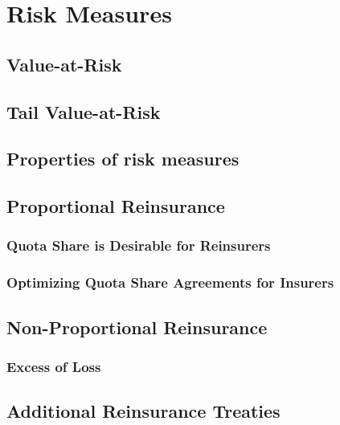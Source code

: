 \documentclass[]{book}
\theoremstyle{definition}
\theoremstyle{definition}
\theoremstyle{definition}
\theoremstyle{remark}
\begin{document}
\section{Risk Measures}\label{S:RiskMeasure}

\subsection{Value-at-Risk}\label{value-at-risk}

\subsection{Tail Value-at-Risk}\label{tail-value-at-risk}

\subsection{Properties of risk
measures}\label{properties-of-risk-measures}

\subsection{Proportional Reinsurance}\label{S:ProportionalRe}

\subsubsection{Quota Share is Desirable for
Reinsurers}\label{quota-share-is-desirable-for-reinsurers}

\subsubsection{Optimizing Quota Share Agreements for
Insurers}\label{optimizing-quota-share-agreements-for-insurers}

\subsection{Non-Proportional Reinsurance}\label{S:NonProportionalRe}

\subsubsection{Excess of Loss}\label{excess-of-loss}

\subsection{Additional Reinsurance Treaties}\label{S:AdditionalRe}
\end{document}
